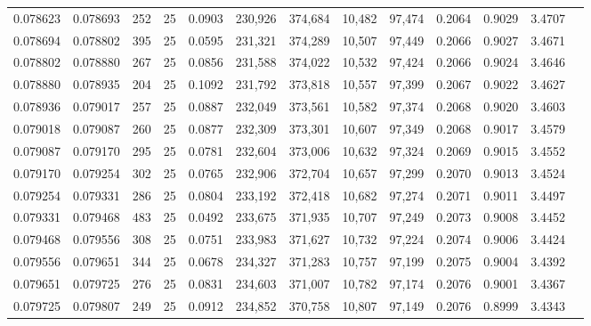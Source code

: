 \begin{tabular}{rrrrrrrrrrrrr}
0.078623 & 0.078693 &   252 &  25 &                                     0.0903 & 230,926 & 374,684 &  10,482 &  97,474 & 0.2064 & 0.9029 & 3.4707 \\
0.078694 & 0.078802 &   395 &  25 &                                     0.0595 & 231,321 & 374,289 &  10,507 &  97,449 & 0.2066 & 0.9027 & 3.4671 \\
0.078802 & 0.078880 &   267 &  25 &                                     0.0856 & 231,588 & 374,022 &  10,532 &  97,424 & 0.2066 & 0.9024 & 3.4646 \\
0.078880 & 0.078935 &   204 &  25 &                                     0.1092 & 231,792 & 373,818 &  10,557 &  97,399 & 0.2067 & 0.9022 & 3.4627 \\
0.078936 & 0.079017 &   257 &  25 &                                     0.0887 & 232,049 & 373,561 &  10,582 &  97,374 & 0.2068 & 0.9020 & 3.4603 \\
0.079018 & 0.079087 &   260 &  25 &                                     0.0877 & 232,309 & 373,301 &  10,607 &  97,349 & 0.2068 & 0.9017 & 3.4579 \\
0.079087 & 0.079170 &   295 &  25 &                                     0.0781 & 232,604 & 373,006 &  10,632 &  97,324 & 0.2069 & 0.9015 & 3.4552 \\
0.079170 & 0.079254 &   302 &  25 &                                     0.0765 & 232,906 & 372,704 &  10,657 &  97,299 & 0.2070 & 0.9013 & 3.4524 \\
0.079254 & 0.079331 &   286 &  25 &                                     0.0804 & 233,192 & 372,418 &  10,682 &  97,274 & 0.2071 & 0.9011 & 3.4497 \\
0.079331 & 0.079468 &   483 &  25 &                                     0.0492 & 233,675 & 371,935 &  10,707 &  97,249 & 0.2073 & 0.9008 & 3.4452 \\
0.079468 & 0.079556 &   308 &  25 &                                     0.0751 & 233,983 & 371,627 &  10,732 &  97,224 & 0.2074 & 0.9006 & 3.4424 \\
0.079556 & 0.079651 &   344 &  25 &                                     0.0678 & 234,327 & 371,283 &  10,757 &  97,199 & 0.2075 & 0.9004 & 3.4392 \\
0.079651 & 0.079725 &   276 &  25 &                                     0.0831 & 234,603 & 371,007 &  10,782 &  97,174 & 0.2076 & 0.9001 & 3.4367 \\
0.079725 & 0.079807 &   249 &  25 &                                     0.0912 & 234,852 & 370,758 &  10,807 &  97,149 & 0.2076 & 0.8999 & 3.4343 \\

\end{tabular}
